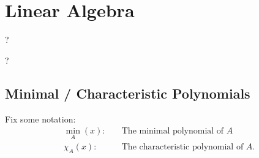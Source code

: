 \hypertarget{linear-algebra-1}{%
\section{Linear Algebra}\label{linear-algebra-1}}

\begin{description}
\tightlist
\item[Definition (Invariant Factor)]
?
\item[Definition (Elementary Divisor)]
?
\end{description}

\hypertarget{minimal-characteristic-polynomials}{%
\subsection{Minimal / Characteristic
Polynomials}\label{minimal-characteristic-polynomials}}

Fix some notation: \begin{align*}
\min_A(x): \quad & \text{The minimal polynomial of } A \\
\chi_A(x): \quad & \text{The characteristic polynomial of } A
.\end{align*}

